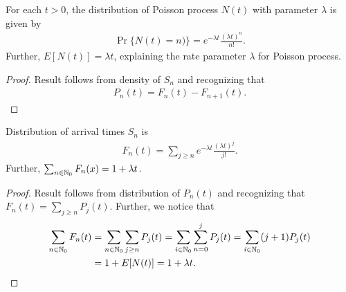 \documentclass[a4paper,10pt,english]{article}
\begin{document}
\begin{thm} For each $t >0$, the distribution of Poisson process $N(t)$ with parameter $\lambda$ is given by
	\begin{align*}
	\Pr\{N(t)=n)\}= e^{-\lambda t}\frac{(\lambda t)^{n}}{n!}.
	\end{align*}
Further, $E[N(t)] = \lambda t$, explaining the rate parameter $\lambda$ for Poisson process.
\end{thm}
\begin{proof}
Result follows from density of $S_n$ and recognizing that 
\begin{align*}
P_n(t) = F_n(t) - F_{n+1}(t).
\end{align*}
\end{proof}

\begin{cor} Distribution of arrival times $S_n$ is 
\begin{align*}
	F_n(t)= \sum_{j \geq n}e^{-\lambda t}\frac{(\lambda t)^{j}}{j!}.
\end{align*}
Further, $\sum_{n \in \mathbb{N}_0}F_n(x) = 1 + \lambda t$.
\end{cor}
\begin{proof}
Result follows from distribution of $P_n(t)$ and recognizing that $F_n(t) =  \sum_{j \geq n}P_j(t)$.
Further, we notice that
\begin{align*}
\sum_{n \in \mathbb{N}_0}F_n(t) &=  \sum_{n \in \mathbb{N}_0}\sum_{j \geq n}P_j(t) = \sum_{i \in \mathbb{N}_0}\sum_{n = 0}^{j}P_j(t) = \sum_{i \in \mathbb{N}_0}(j+1)P_j(t)\\
&= 1 + E[N(t)] = 1 + \lambda t.
\end{align*}
\end{proof}
\end{document}

